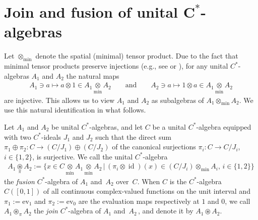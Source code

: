 \section[Join and fusion of unital $C^*$-algebras]{Join and fusion of unital $\boldsymbol{C^*}$-algebras}


Let $\otimes_{\min}$ denote the spatial (minimal) tensor product.
Due to the fact that minimal tensor products preserve injections
 (e.g., see \cite[Proposition~4.22]{t-m79} or
\cite[Section~1.3]{w-s94}),
for any unital $C^*$-algebras $A_1$ and $A_2$ the natural maps
\begin{gather*}
A_1\ni a\longmapsto a\otimes 1\in A_1 \underset{\min}{\otimes} A_2\qquad \text{and}
\qquad  A_2\ni a\longmapsto 1\otimes a\in A_1 \underset{\min}{\otimes} A_2
\end{gather*}
are injective. This allows us to view $A_1$ and $A_2$ as subalgebras of
$A_1 \otimes_{\min} A_2$. We use this natural identif\/ication in what follows.
\begin{Definition}\label{gjoin}
Let $A_1$ and $A_2$  be unital $C^*$-algebras, and
let $C$ be a unital $C^*$-algebra equipped with two $C^*$-ideals $J_1$ and $ J_2$
such that the direct sum
$
\pi_1\oplus\pi_2\colon C\rightarrow (C/J_1) \oplus (C/J_2)
$
of the canonical surjections $\pi_i\colon C\to C/J_i$, $i\in \{1,2\}$, is surjective.
We call the unital $C^*$-algebra
\begin{gather*}
A_1 \underset{\pi}{\circledast} A_2 :=
\big\{x\in C \underset{\min}{\otimes} A_1 \underset{\min}{\otimes} A_2 \,
\big|\,
(\pi_i\otimes \operatorname{id})(x) \in
(C/J_i)\otimes_{\min}A_i
, \, i\in\{1,2\}
\big\}
\end{gather*}
the \emph{fusion} $C^*$-algebra of $A_1$ and~$A_2$ over~$C$.
When $C$ is the $C^*$-algebra $C([0,1])$ of all continuous complex-valued
functions on the unit interval and
$\pi_1:=\mathrm{ev}_1$ and $\pi_2:=\mathrm{ev}_0$ are
the evaluation maps respectively at $1$ and $0$,
we call $A_1 \circledast_\pi A_2$ the \emph{join} $C^*$-algebra of $A_1$ and~$A_2\,$, and denote it by
 $A_1 \circledast A_2$.
\end{Definition}
